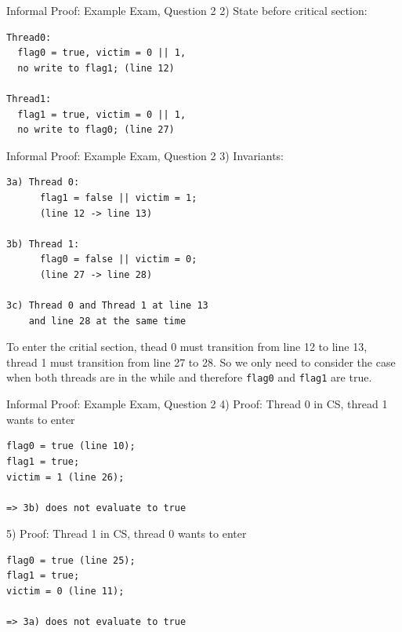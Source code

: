 \begin{frame}[fragile]{Informal Proof: Example Exam, Question 2}
  2) State before critical section:

  \begin{lstlisting}
Thread0: 
  flag0 = true, victim = 0 || 1, 
  no write to flag1; (line 12)

Thread1: 
  flag1 = true, victim = 0 || 1, 
  no write to flag0; (line 27)
  \end{lstlisting}
\end{frame}

\begin{frame}[fragile]{Informal Proof: Example Exam, Question 2}
  3) Invariants:

  \begin{lstlisting}
3a) Thread 0: 
      flag1 = false || victim = 1; 
      (line 12 -> line 13)

3b) Thread 1: 
      flag0 = false || victim = 0; 
      (line 27 -> line 28)

3c) Thread 0 and Thread 1 at line 13 
    and line 28 at the same time
  \end{lstlisting}

  To enter the critial section, thead 0 must transition from line 12
  to line 13, thread 1 must transition from line 27 to 28. So we only
  need to consider the case when both threads are in the while and
  therefore \lstinline!flag0! and \lstinline!flag1! are true.
\end{frame}

\begin{frame}[fragile]{Informal Proof: Example Exam, Question 2}
  4) Proof: Thread 0 in CS, thread 1 wants to enter

  \begin{lstlisting}
flag0 = true (line 10); 
flag1 = true;
victim = 1 (line 26);

=> 3b) does not evaluate to true
  \end{lstlisting}


  5) Proof: Thread 1 in CS, thread 0 wants to enter

  \begin{lstlisting}
flag0 = true (line 25); 
flag1 = true;
victim = 0 (line 11);

=> 3a) does not evaluate to true
  \end{lstlisting}
\end{frame}

